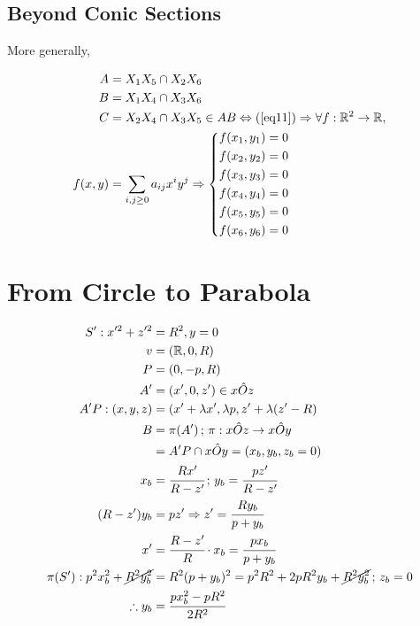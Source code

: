 \documentclass[12pt]{article}
\begin{document}
\normalsize

\subsection{Beyond Conic Sections}

More generally,

\begin{align}
    A &= X_1 X_5 \cap X_2 X_6 \\
    B &= X_1 X_4 \cap X_3 X_6 \\
    C &= X_2 X_4 \cap X_3 X_5 \in AB\Leftrightarrow (\ref{eq11}) \Rightarrow \forall f : \mathbb{R}^2 \to \mathbb{R},\\
    f(x,y) &= \sum_{i,j\ge 0} a_{ij} x^i y^j\Rightarrow \left\{\begin{aligned}
        f(x_1,y_1) &= 0 \\
        f(x_2,y_2) &= 0 \\
        f(x_3,y_3) &= 0 \\
        f(x_4,y_4) &= 0 \\
        f(x_5,y_5) &= 0 \\
        f(x_6,y_6) &= 0 
    \end{aligned}\right. \\
\end{align}

\section{From Circle to Parabola}

\begin{align}
S': x'^2 + z'^2 &= R^2, y = 0 \\
v &= (\mathbb{R}, 0, R) \\
P &= (0, -p, R) \\
A' &= (x', 0, z') \in x\hat Oz \\
A'P: (x,y,z) &= (x' + \lambda x', \lambda p, z' + \lambda (z' - R) \\
B &= \pi(A')\,;\,\pi: x\hat Oz \to x\hat Oy \\
&= A'P \cap x\hat O y = (x_b, y_b, z_b = 0) \\
x_b &= \cfrac{Rx'}{R-z'}\,;\,y_b = \cfrac{pz'}{R-z'} \\
(R - z') y_b &= pz' \Rightarrow z' = \cfrac{Ry_b}{p+y_b} \\
x' &= \cfrac{R-z'}{R}\cdot x_b = \cfrac{px_b}{p+y_b} \\
\pi(S'): p^2 x_b^2 + \cancel{R^2 y_b^2} &= R^2 (p+y_b)^2 = p^2 R^2 + 2pR^2y_b + \cancel{R^2 y_b^2}\,;\,z_b=0 \\
\therefore y_b &= \cfrac{px_b^2 - p R^2}{2R^2}
\end{align}
\end{document}
